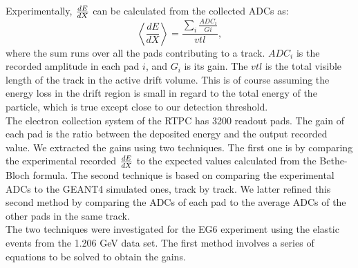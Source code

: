 Experimentally, $\small{\frac{dE}{dX}}$ can be calculated from the collected ADCs as: 
\begin{equation}
 \left\langle \frac{dE}{dX} \right\rangle= \frac{\sum\limits_{i} \frac{ADC_{i}}{Gi}}{vtl},
\end{equation}
where the sum runs over all the pads contributing to a track. $ADC_{i}$ is the recorded amplitude in each pad $i$, and $G_{i}$ is its gain. The $vtl$ is the total visible length of the track in the active drift volume. This is of course assuming the energy loss in the drift region is small in regard to the total energy of the particle, which is true except close to our detection threshold.\\

The electron collection system of the RTPC has 3200 readout pads. The gain of each pad is the ratio between the deposited energy and the output recorded value. We extracted the gains using two techniques. The first one is by comparing the experimental recorded $\small{\frac{dE}{dX}}$ to the expected values calculated from the Bethe-Bloch formula. The second technique is based on comparing the experimental ADCs to the GEANT4 simulated ones, track by track. We latter refined this second method by comparing the ADCs of each pad to the average ADCs of the other pads in the same track.\\

The two techniques were investigated for the EG6 experiment using the elastic 
events from the 1.206 GeV data set. The first method involves a series of 
equations to be solved to obtain the gains.
 
